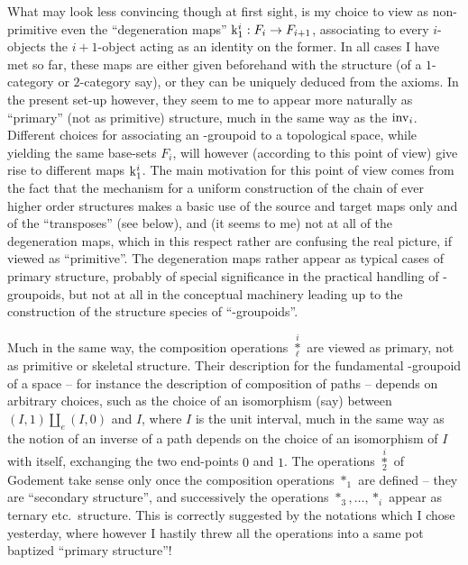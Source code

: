 What may look less convincing though at first sight, is my choice to
view as non-primitive even the ``degeneration maps'' $\mathrm{k}_1^i : F_i
\to F_{i+1}$, associating to every $i$-objects the $i+1$-object acting
as an identity on the former. In all cases I have met so far, these
maps are either given beforehand with the structure (of a $1$-category
or $2$-category say), or they can be uniquely deduced from the
axioms. In the present set-up however, they seem to me to appear more
naturally as ``primary'' (not as primitive) structure, much in the
same way as the $\operatorname{inv}_i$. Different choices for associating an
\oo-groupoid to a topological space, while yielding the same base-sets
$F_i$, will however (according to this point of view) give rise to
different maps $\mathrm{k}_1^i$. The main motivation for this point of
view comes from the fact that the mechanism for a uniform construction
of the chain of ever higher order structures makes a basic use of the
source and target maps only and of the ``transposes'' (see below), and
(it seems to me) not at all of the degeneration maps, which in this
respect rather are confusing the real picture, if viewed as
``primitive''.
The degeneration maps rather appear as typical cases of primary
structure, probably of special significance in the practical handling
of \oo-groupoids, but not at all in the conceptual machinery leading
up to the construction of the structure species of ``\oo-groupoids''.

Much in the same way, the composition operations
$\overset{i}{\underset{\ell}{*}}$ are viewed as primary, not as
primitive or skeletal structure. Their description for the fundamental
\oo-groupoid of a space -- for instance the description of composition
of paths -- depends on arbitrary choices, such as the choice of an
isomorphism (say) between $(I,1) \amalg_e (I,0)$ and $I$, where $I$ is
the unit interval, much in the same way as the notion of an inverse of
a path depends on the choice of an isomorphism of $I$ with itself,
exchanging the two end-points $0$ and $1$. The operations
$\overset{i}{\underset{2}{*}}$ of Godement take sense only once the
composition operations $*_1$ are defined -- they are ``secondary
structure'', and successively the operations $*_3, \ldots, *_i$ appear
as ternary etc.\ structure. This is correctly suggested by the
notations which I chose yesterday, where however I hastily threw all
the operations into a same pot baptized ``primary structure''!

